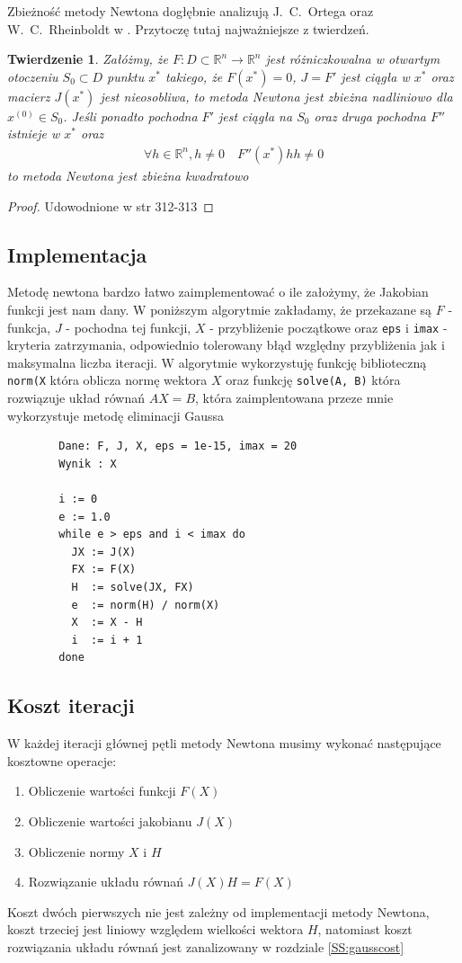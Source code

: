\documentclass[11pt,wide]{mwart}
\newtheorem{tw}{Twierdzenie}
\begin{document}
Zbieżność metody Newtona dogłębnie analizują J.~C.~Ortega oraz W.~C.~Rheinboldt w \cite{ortega}. Przytoczę tutaj najważniejsze z twierdzeń.
\begin{tw}
Załóżmy, że $ F : D \subset \mathbb{R}^n \rightarrow \mathbb{R}^n $ jest różniczkowalna w otwartym otoczeniu $ S_0 \subset D $ punktu $ x^* $ takiego, że $ F(x^*) = 0 $, $ J = F' $ jest ciągła w $ x^* $ oraz macierz $ J(x^*) $ jest nieosobliwa, to metoda Newtona jest zbieżna nadliniowo dla $ x^{(0)} \in S_0 $. Jeśli ponadto pochodna $ F' $ jest ciągła na $ S_0 $ oraz druga pochodna $ F'' $ istnieje w $ x^* $ oraz 
\begin{align}
	\forall h \in \mathbb{R}^n, h \neq 0 \quad F''(x^*)hh \neq 0
\end{align}
to metoda Newtona jest zbieżna kwadratowo
\end{tw}
\begin{proof}
	Udowodnione w \cite{ortega} str 312-313
\end{proof}
\subsection{Implementacja}
Metodę newtona bardzo łatwo zaimplementować o ile założymy, że Jakobian funkcji jest nam dany. W poniższym algorytmie zakładamy, że przekazane są $ F $ - funkcja, $ J $ - pochodna tej funkcji, $ X $ - przybliżenie początkowe oraz \texttt{eps} i \texttt{imax} -kryteria zatrzymania, odpowiednio tolerowany błąd względny przybliżenia jak i maksymalna liczba iteracji. W algorytmie wykorzystuję funkcję biblioteczną \texttt{norm(X} która oblicza normę wektora $ X $ oraz funkcję \texttt{solve(A, B)} która rozwiązuje układ równań $ AX = B $, która zaimplentowana przeze mnie wykorzystuje metodę eliminacji Gaussa
\begin{verbatim}
		Dane: F, J, X, eps = 1e-15, imax = 20
		Wynik : X
		
		i := 0
		e := 1.0
		while e > eps and i < imax do
		  JX := J(X)
		  FX := F(X)
		  H  := solve(JX, FX)
		  e  := norm(H) / norm(X)
		  X  := X - H
		  i  := i + 1
		done			
\end{verbatim}
\subsection{Koszt iteracji}
W każdej iteracji głównej pętli metody Newtona musimy wykonać następujące kosztowne operacje:
\begin{enumerate}
\item Obliczenie wartości funkcji $ F(X) $
\item Obliczenie wartości jakobianu $ J(X) $
\item Obliczenie normy $ X $ i $ H $
\item Rozwiązanie układu równań $ J(X)H = F(X)$
\end{enumerate}
Koszt dwóch pierwszych nie jest zależny od implementacji metody Newtona, koszt trzeciej jest liniowy względem wielkości wektora $ H $, natomiast koszt rozwiązania układu równań jest zanalizowany w rozdziale \ref{SS:gausscost}
\end{document}
